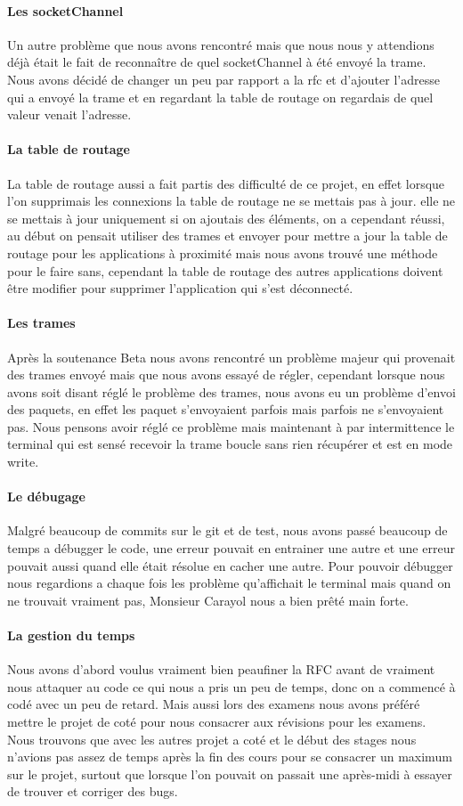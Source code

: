 \documentclass[a4paper,titlepage]{report}
\begin{document}
\paragraph{Les socketChannel}
Un autre problème que nous avons rencontré mais que nous nous y attendions déjà était le fait de reconnaître de quel socketChannel à été envoyé la trame.
Nous avons décidé de changer un peu par rapport a la rfc et d'ajouter l'adresse qui a envoyé la trame et en regardant la table de routage on regardais de quel valeur venait l'adresse.
\paragraph{La table de routage}
La table de routage aussi a fait partis des difficulté de ce projet, en effet lorsque l'on supprimais les connexions la table de routage ne se mettais pas à jour. elle ne se mettais à jour uniquement si on ajoutais des éléments, on a cependant réussi, au début on pensait utiliser des trames et envoyer pour mettre a jour la table de routage pour les applications à proximité mais nous avons trouvé une méthode pour le faire sans, cependant la table de routage des autres applications doivent être modifier pour supprimer l'application qui s'est déconnecté.
\paragraph{Les trames}
Après la soutenance Beta nous avons rencontré un problème majeur qui provenait des trames envoyé mais que nous avons essayé de régler, cependant lorsque nous avons soit disant réglé le problème des trames, nous avons eu un problème d'envoi des paquets, en effet les paquet s'envoyaient parfois mais parfois ne s'envoyaient pas.
Nous pensons avoir réglé ce problème mais maintenant à par intermittence le terminal qui est sensé recevoir la trame boucle sans rien récupérer et est en mode write.
\paragraph{Le débugage}
Malgré beaucoup de commits sur le git et de test, nous avons passé beaucoup de temps a débugger le code, une erreur pouvait en entrainer une autre et une erreur pouvait aussi quand elle était résolue en cacher une autre. Pour pouvoir débugger nous regardions a chaque fois les problème qu'affichait le terminal mais quand on ne trouvait vraiment pas, Monsieur Carayol nous a bien prêté main forte. 
\paragraph{La gestion du temps}
Nous avons d'abord voulus vraiment bien peaufiner la RFC avant de vraiment nous attaquer au code ce qui nous a pris un peu de temps, donc on a commencé à codé avec un peu de retard.
Mais aussi lors des examens nous avons préféré mettre le projet de coté pour nous consacrer aux révisions pour les examens.
Nous trouvons que avec les autres projet a coté et le début des stages nous n'avions pas assez de temps après la fin des cours pour se consacrer un maximum sur le projet, surtout que lorsque l'on pouvait on passait une après-midi à essayer de trouver et corriger des bugs.
\end{document}
